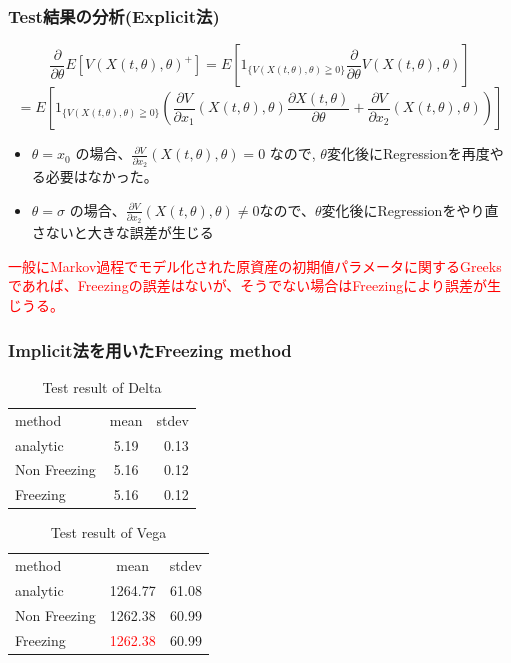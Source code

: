 \documentclass[driverfallback=dvipdfmx,cjk]{beamer}
\begin{document}
\begin{frame}\frametitle{Test結果の分析(Explicit法)}
    $$ \frac{\partial}{\partial \theta} E[V\left(X(t, \theta ), \theta \right)^+ ] = E[ 1_{\{  V\left(X(t, \theta), \theta\right) \geqq 0 \} }  \frac{\partial}{\partial \theta} V\left(X(t, \theta) , \theta \right)] $$
    $$= E[ 1_{\{  V\left(X(t, \theta), \theta\right) \geqq 0 \} }  \left(\frac{\partial V}{\partial x_1} \left(X(t, \theta) , \theta \right)\frac{\partial X(t, \theta)}{\partial \theta}  + \frac{\partial V}{\partial x_2} \left(X(t, \theta) , \theta \right)\right) ] $$
    \begin{itemize}
        \item $\theta = x_0$ の場合、$\frac{\partial V}{\partial x_2} \left(X(t, \theta) , \theta \right) = 0$ なので, $\theta$変化後にRegressionを再度やる必要はなかった。
        \item $\theta = \sigma$ の場合、$\frac{\partial V}{\partial x_2} \left(X(t, \theta) , \theta \right) \ne 0$なので、$\theta$変化後にRegressionをやり直さないと大きな誤差が生じる
    \end{itemize}
    \textcolor{red}{一般にMarkov過程でモデル化された原資産の初期値パラメータに関するGreeksであれば、Freezingの誤差はないが、そうでない場合はFreezingにより誤差が生じうる。}
\end{frame}

\begin{frame}\frametitle{Implicit法を用いたFreezing method}
    \begin{table}[htb]
        \caption{Test result of Delta}
        \centering
        \begin{tabular}{lcr}
            \hline
            method & mean & stdev \\
            analytic & 5.19 & 0.13 \\
            Non Freezing & 5.16 & 0.12\\
            Freezing & 5.16 & 0.12
        \end{tabular}
    \end{table}
    \begin{table}[htb]
        \caption{Test result of Vega}
        \centering
        \begin{tabular}{lcr}
            \hline
            method & mean & stdev \\
            analytic & 1264.77 & 61.08\\
            Non Freezing & 1262.38 & 60.99\\
            Freezing & \textcolor{red}{1262.38 } & 60.99
        \end{tabular}
    \end{table}

\end{frame}
\end{document}
